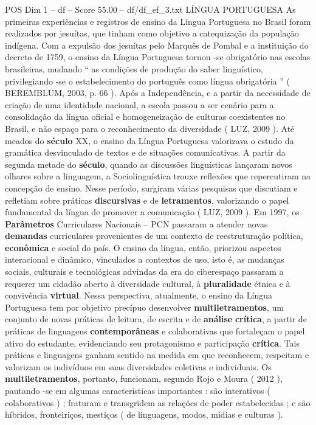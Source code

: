 \begin{textsample}{POS Dim 1 – df – Score 55.00 – df/df\_ef\_3.txt}  \label{ex:f1_pos_122}
LÍNGUA PORTUGUESA As primeiras experiências e registros de ensino da Língua Portuguesa no Brasil foram realizados por jesuítas, que tinham como objetivo a catequização da população indígena.
Com a expulsão dos jesuítas pelo Marquês de Pombal e a instituição do decreto de 1759, o ensino da Língua Portuguesa tornou -se obrigatório nas escolas brasileiras, mudando “ as condições de produção do saber linguístico, privilegiando -se o estabelecimento do português como língua obrigatória ” ( BEREMBLUM, 2003, p. 66 ).
Após a Independência, e a partir da necessidade de criação de uma identidade nacional, a escola passou a ser cenário para a consolidação da língua oficial e homogeneização de culturas coexistentes no Brasil, e não espaço para o reconhecimento da diversidade ( LUZ, 2009 ).
Até meados do \textbf{século} XX, o ensino da Língua Portuguesa valorizava o estudo da gramática desvinculado de textos e de situações comunicativas.
A partir da segunda metade do \textbf{século}, quando as discussões linguísticas lançaram novos olhares sobre a linguagem, a Sociolinguística trouxe reflexões que repercutiram na concepção de ensino.
Nesse período, surgiram várias pesquisas que discutiam e refletiam sobre práticas \textbf{discursivas} e de \textbf{letramentos}, valorizando o papel fundamental da língua de promover a comunicação ( LUZ, 2009 ).
Em 1997, os \textbf{Parâmetros} Curriculares Nacionais – PCN passaram a atender novas \textbf{demandas} curriculares provenientes de um contexto de reestruturação política, \textbf{econômica} e social do país.
O ensino da língua, então, priorizou aspectos interacional e dinâmico, vinculados a contextos de uso, isto é, as mudanças sociais, culturais e tecnológicas advindas da era do ciberespaço passaram a requerer um cidadão aberto à diversidade cultural, à \textbf{pluralidade} étnica e à convivência \textbf{virtual}.
Nessa perspectiva, atualmente, o ensino da Língua Portuguesa tem por objetivo precípuo desenvolver \textbf{multiletramentos}, um conjunto de novas práticas de leitura, de escrita e de \textbf{análise} \textbf{crítica}, a partir de práticas de linguagens \textbf{contemporâneas} e colaborativas que fortaleçam o papel ativo do estudante, evidenciando seu protagonismo e participação \textbf{crítica}.
Tais práticas e linguagens ganham sentido na medida em que reconhecem, respeitam e valorizam os indivíduos em suas diversidades coletivas e individuais.
Os \textbf{multiletramentos}, portanto, funcionam, segundo Rojo e Moura ( 2012 ), pautando -se em algumas características importantes : são interativos ( colaborativos ) ; fraturam e transgridem as relações de poder estabelecidas ; e são híbridos, fronteiriços, mestiços ( de linguagens, modos, mídias e culturas ).

\end{textsample}
